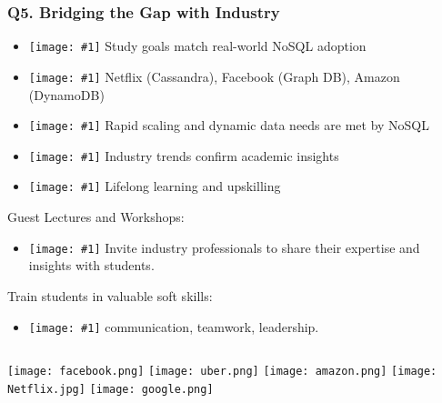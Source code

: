 \documentclass{beamer}
\newcommand{\icon}[1]{\texttt{[image: \#1]}}
\begin{document}
\begin{frame}[t]
\frametitle{Q5. Bridging the Gap with Industry}
\vspace{-0.4cm}
\begin{itemize}
    \item \icon{check-mark.png} Study goals match real-world NoSQL adoption
    \item \icon{check-mark.png} Netflix (Cassandra), Facebook (Graph DB), Amazon (DynamoDB)
    \item \icon{check-mark.png} Rapid scaling and dynamic data needs are met by NoSQL
    \item \icon{check-mark.png} Industry trends confirm academic insights
    \item \icon{check-mark.png} Lifelong learning and upskilling
\end{itemize}
\vspace{-0.2cm}
\begin{block}{Guest Lectures and Workshops:}
    \begin{itemize}
        \item \icon{check-mark.png} Invite industry professionals to share their expertise and insights with students.
    \end{itemize}
\end{block}
\vspace{-0.2cm}
\begin{block}{Train students in valuable soft skills:}
    \begin{itemize}
        \item \icon{check-mark.png} communication, teamwork, leadership.
    \end{itemize}
\end{block}
\begin{columns}
    \hspace*{0.6cm}\texttt{[image: facebook.png]}
    \texttt{[image: uber.png]}
    \texttt{[image: amazon.png]}
    \texttt{[image: Netflix.jpg]}
    \texttt{[image: google.png]}
\end{columns}
\end{frame}
\end{document}
